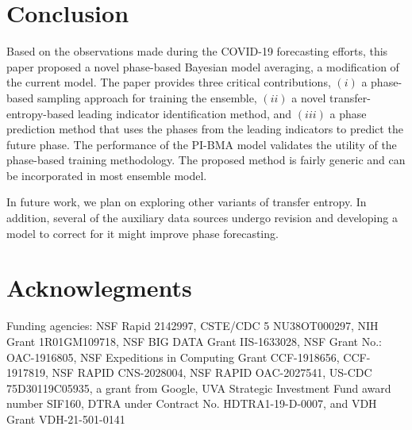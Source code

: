 \documentclass[conference,compsoc]{IEEEtran}
\begin{document}


\section{Conclusion}
Based on the observations made during the COVID-19 forecasting efforts, this paper proposed a novel phase-based Bayesian model averaging, a modification of the current model. The paper provides three critical contributions, $(i)$ a phase-based sampling approach for training the ensemble, $(ii)$ a novel transfer-entropy-based leading indicator identification method, and $(iii)$ a phase prediction method that uses the phases from the leading indicators to predict the future phase. The performance of the PI-BMA model validates the utility of the  phase-based training methodology. The proposed method is fairly generic and can be incorporated in most ensemble model.

In future work, we plan on exploring other variants of transfer entropy. In addition, several of the auxiliary data sources undergo revision and developing a model to correct for it might improve phase forecasting. 

\section{Acknowlegments}
Funding agencies: NSF Rapid 2142997, CSTE/CDC 5 NU38OT000297, NIH Grant 1R01GM109718, NSF BIG DATA Grant IIS-1633028, NSF Grant No.: OAC-1916805, NSF Expeditions in Computing Grant CCF-1918656, CCF-1917819, NSF RAPID CNS-2028004, NSF RAPID OAC-2027541, US-CDC 75D30119C05935, a grant from Google, UVA Strategic Investment Fund award number SIF160, DTRA under Contract No. HDTRA1-19-D-0007, and VDH Grant VDH-21-501-0141



\end{document}
